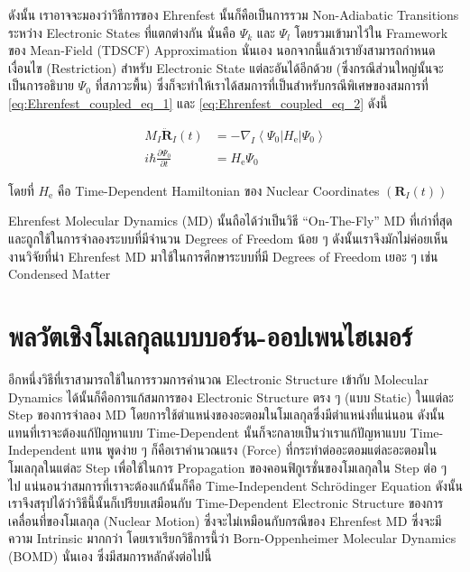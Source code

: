 ดังนั้น เราอาจจะมองว่าวิธีการของ Ehrenfest นั้นก็คือเป็นการรวม Non-Adiabatic Transitions ระหว่าง Electronic States ที่แตกต่างกัน
นั่นคือ $\Psi_k$ และ $\Psi_l$ โดยรวมเข้ามาไว้ใน Framework ของ Mean-Field (TDSCF) Approximation นั่นเอง
นอกจากนี้แล้วเรายังสามารถกำหนดเงื่อนไข (Restriction) สำหรับ Electronic State แต่ละอันได้อีกด้วย (ซึ่งกรณีส่วนใหญ่นั้นจะเป็นการอธิบาย
$\Psi_0$ ที่สภาวะพื้น) ซึ่งก็จะทำให้เราได้สมการที่เป็นสำหรับกรณีพิเศษของสมการที่ \eqref{eq:Ehrenfest_coupled_eq_1} และ
\eqref{eq:Ehrenfest_coupled_eq_2} ดังนี้

\begin{align}
  \label{eq:Ehrenfest_EoQ_1}
  M_I \ddot{\mathbf{R}}_I(t)
   & =
  -\nabla_I\left\langle\Psi_0\left|H_{\mathrm{e}}\right| \Psi_0\right\rangle \\
  \label{eq:Ehrenfest_EoQ_2}
  i \hbar \frac{\partial \Psi_0}{\partial t}
   & = H_{\mathrm{e}} \Psi_0
\end{align}

\noindent โดยที่ $H_{\mathrm{e}}$ คือ Time-Dependent Hamiltonian ของ Nuclear Coordinates
$(\mathbf{R}_I(t))$

Ehrenfest Molecular Dynamics (MD) นั้นถือได้ว่าเป็นวิธี \enquote{On-The-Fly} MD ที่เก่าที่สุดและถูกใช้ในการจำลองระบบที่มีจำนวน
Degrees of Freedom น้อย ๆ ดังนั้นเราจึงมักไม่ค่อยเห็นงานวิจัยที่นำ Ehrenfest MD มาใช้ในการศึกษาระบบที่มี Degrees of Freedom เยอะ ๆ
เช่น Condensed Matter

\section{พลวัตเชิงโมเลกุลแบบบอร์น-ออปเพนไฮเมอร์}

อีกหนึ่งวิธีที่เราสามารถใช้ในการรวมการคำนวณ Electronic Structure เข้ากับ Molecular Dynamics ได้นั้นก็คือการแก้สมการของ Electronic
Structure ตรง ๆ (แบบ Static) ในแต่ละ Step ของการจำลอง MD โดยการใช้ตำแหน่งของอะตอมในโมเลกุลซึ่งมีตำแหน่งที่แน่นอน ดังนั้น
แทนที่เราจะต้องแก้ปัญหาแบบ Time-Dependent นั้นก็จะกลายเป็นว่าเราแก้ปัญหาแบบ Time-Independent แทน พูดง่าย ๆ ก็คือเราคำนวณแรง
(Force) ที่กระทำต่ออะตอมแต่ละอะตอมในโมเลกุลในแต่ละ Step เพื่อใช้ในการ Propagation ของคอนฟิกูเรชั่นของโมเลกุลใน Step ต่อ ๆ ไป
แน่นอนว่าสมการที่เราจะต้องแก้นั้นก็คือ Time-Independent Schr\"{o}dinger Equation ดังนั้นเราจึงสรุปได้ว่าวิธีนี้นั้นก็เปรียบเสมือนกับ
Time-Dependent Electronic Structure ของการเคลื่อนที่ของโมเลกุล (Nuclear Motion) ซึ่งจะไม่เหมือนกับกรณีของ Ehrenfest MD
ซึ่งจะมีความ Intrinsic มากกว่า โดยเราเรียกวิธีการนี้ว่า Born-Oppenheimer Molecular Dynamics (BOMD) นั่นเอง ซึ่งมีสมการหลักดังต่อไปนี้


